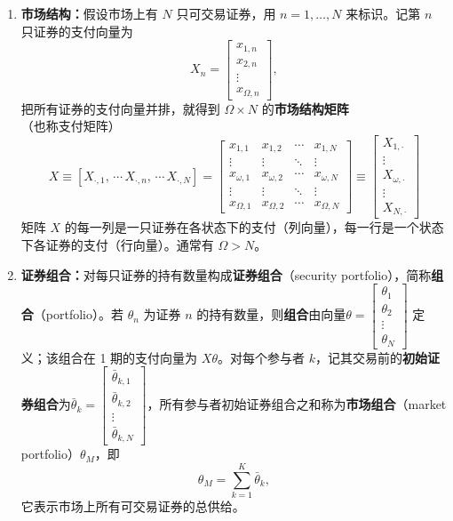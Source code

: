 \begin{tcolorbox}[knowledge,title=2.3 证券市场]
\begin{enumerate}
    \item \textbf{市场结构：}假设市场上有 $N$ 只可交易证券，用 $n=1,\dots,N$ 来标识。记第 $n$ 只证券的支付向量为
    \[
        X_n=\begin{bmatrix}x_{1,n} \\ x_{2,n} \\ \vdots \\ x_{\Omega,n}\end{bmatrix},
    \]
    把所有证券的支付向量并排，就得到 $\Omega\times N$ 的\textbf{市场结构矩阵}（也称支付矩阵）
    \[
        X\equiv[X_{\cdot,1},\,\cdots\,X_{\cdot,n},\,\cdots\,X_{\cdot,N}]=
        \begin{bmatrix}
            x_{1,1}   & x_{1,2}   & \cdots & x_{1,N}   \\
            \vdots    & \vdots    & \ddots & \vdots    \\
            x_{\omega,1}   & x_{\omega,2}   & \cdots & x_{\omega,N}   \\
            \vdots    & \vdots    & \ddots & \vdots    \\
            x_{\Omega,1} & x_{\Omega,2} & \cdots & x_{\Omega,N}
        \end{bmatrix}\equiv
        \begin{bmatrix}
            X_{1,\cdot} \\ \vdots \\ X_{\omega,\cdot} \\ \vdots \\ X_{N,\cdot}
        \end{bmatrix}
    \]
    矩阵 $X$ 的每一列是一只证券在各状态下的支付（列向量），每一行是一个状态下各证券的支付（行向量）。通常有 $\Omega>N$。

    \item \textbf{证券组合：}对每只证券的持有数量构成\textbf{证券组合}（security portfolio），简称\textbf{组合}（portfolio）。若 $\theta_n$ 为证券 $n$ 的持有数量，则\textbf{组合}由向量$\theta=\begin{bmatrix}\theta_1 \\ \theta_2 \\ \vdots \\ \theta_N\end{bmatrix}$ 定义；该组合在 1 期的支付向量为 $X\theta$。对每个参与者 $k$，记其交易前的\textbf{初始证券组合}为$\bar{\theta}_k=\begin{bmatrix}\bar{\theta}_{k,1} \\ \bar{\theta}_{k,2} \\ \vdots \\ \bar{\theta}_{k,N}\end{bmatrix}$，所有参与者初始证券组合之和称为\textbf{市场组合}（market portfolio）$\theta_M$，即
    \[
        \theta_M=\sum_{k=1}^{K}\bar{\theta}_k,
    \]
    它表示市场上所有可交易证券的总供给。


\end{enumerate}
\end{tcolorbox}
